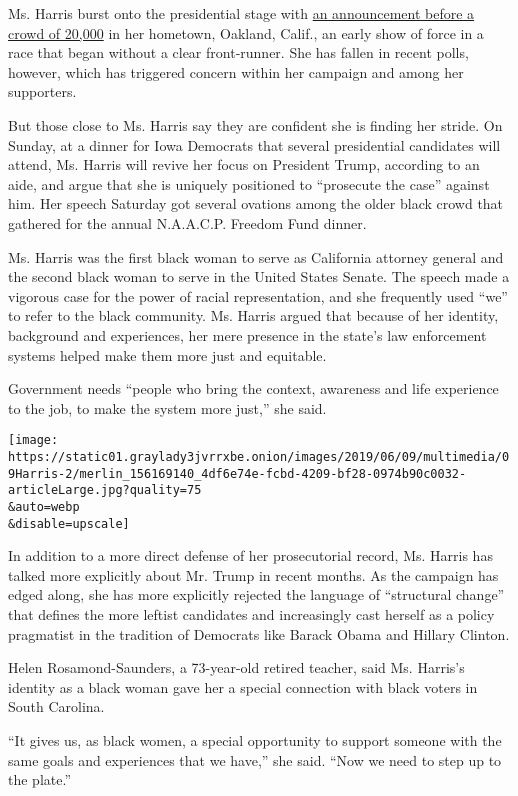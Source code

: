 Ms. Harris burst onto the presidential stage with
\href{https://www.nytimes3xbfgragh.onion/2019/01/27/us/politics/kamala-harris-rally-2020.html}{an
announcement before a crowd of 20,000} in her hometown, Oakland, Calif.,
an early show of force in a race that began without a clear
front-runner. She has fallen in recent polls, however, which has
triggered concern within her campaign and among her supporters.

But those close to Ms. Harris say they are confident she is finding her
stride. On Sunday, at a dinner for Iowa Democrats that several
presidential candidates will attend, Ms. Harris will revive her focus on
President Trump, according to an aide, and argue that she is uniquely
positioned to ``prosecute the case'' against him. Her speech Saturday
got several ovations among the older black crowd that gathered for the
annual N.A.A.C.P. Freedom Fund dinner.

Ms. Harris was the first black woman to serve as California attorney
general and the second black woman to serve in the United States Senate.
The speech made a vigorous case for the power of racial representation,
and she frequently used ``we'' to refer to the black community. Ms.
Harris argued that because of her identity, background and experiences,
her mere presence in the state's law enforcement systems helped make
them more just and equitable.

Government needs ``people who bring the context, awareness and life
experience to the job, to make the system more just,'' she said.

\texttt{[image: https://static01.graylady3jvrrxbe.onion/images/2019/06/09/multimedia/09Harris-2/merlin\_156169140\_4df6e74e-fcbd-4209-bf28-0974b90c0032-articleLarge.jpg?quality=75\\\&auto=webp\\\&disable=upscale]}

In addition to a more direct defense of her prosecutorial record, Ms.
Harris has talked more explicitly about Mr. Trump in recent months. As
the campaign has edged along, she has more explicitly rejected the
language of ``structural change'' that defines the more leftist
candidates and increasingly cast herself as a policy pragmatist in the
tradition of Democrats like Barack Obama and Hillary Clinton.

Helen Rosamond-Saunders, a 73-year-old retired teacher, said Ms.
Harris's identity as a black woman gave her a special connection with
black voters in South Carolina.

``It gives us, as black women, a special opportunity to support someone
with the same goals and experiences that we have,'' she said. ``Now we
need to step up to the plate.''

